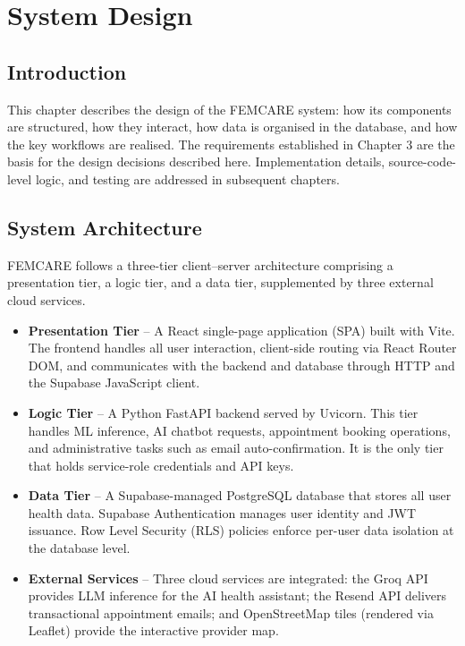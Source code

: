 
\chapter{System Design}\doublespacing
\label{chap:design}

\section{Introduction}
\label{sec:design-intro}

This chapter describes the design of the FEMCARE system: how its components are structured, how they interact, how data is organised in the database, and how the key workflows are realised. The requirements established in Chapter 3 are the basis for the design decisions described here. Implementation details, source-code-level logic, and testing are addressed in subsequent chapters.

\section{System Architecture}
\label{sec:architecture}

FEMCARE follows a three-tier client--server architecture comprising a presentation tier, a logic tier, and a data tier, supplemented by three external cloud services.

\begin{itemize}
    \item \textbf{Presentation Tier} -- A React single-page application (SPA) built with Vite. The frontend handles all user interaction, client-side routing via React Router DOM, and communicates with the backend and database through HTTP and the Supabase JavaScript client.

    \item \textbf{Logic Tier} -- A Python FastAPI backend served by Uvicorn. This tier handles ML inference, AI chatbot requests, appointment booking operations, and administrative tasks such as email auto-confirmation. It is the only tier that holds service-role credentials and API keys.

    \item \textbf{Data Tier} -- A Supabase-managed PostgreSQL database that stores all user health data. Supabase Authentication manages user identity and JWT issuance. Row Level Security (RLS) policies enforce per-user data isolation at the database level.

    \item \textbf{External Services} -- Three cloud services are integrated: the Groq API provides LLM inference for the AI health assistant; the Resend API delivers transactional appointment emails; and OpenStreetMap tiles (rendered via Leaflet) provide the interactive provider map.
\end{itemize}

